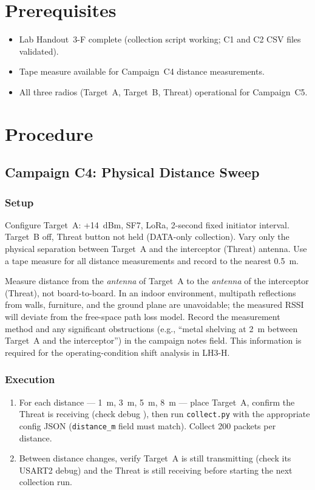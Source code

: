 \documentclass[11pt,letterpaper]{article}
\begin{document}
\section{Prerequisites}
\begin{itemize}[leftmargin=2em]
	\item Lab Handout~3-F complete (collection script working; C1 and C2 CSV files validated).
	\item Tape measure available for Campaign~C4 distance measurements.
	\item All three radios (Target~A, Target~B, Threat) operational for Campaign~C5.
\end{itemize}

\section{Procedure}

\subsection{Campaign C4: Physical Distance Sweep}

\subsubsection{Setup}
Configure Target~A: +14~dBm, SF7, LoRa, 2-second fixed initiator interval. Target~B off, Threat button not held (DATA-only collection). Vary only the physical separation between Target~A and the interceptor (Threat) antenna. Use a tape measure for all distance measurements and record to the nearest 0.5~m.

\begin{tcolorbox}[warning={Distance Measurement Protocol}]
	Measure distance from the \emph{antenna} of Target~A to the \emph{antenna} of the interceptor (Threat), not board-to-board. In an indoor environment, multipath reflections from walls, furniture, and the ground plane are unavoidable; the measured \mbox{RSSI} will deviate from the free-space path loss model. Record the measurement method and any significant obstructions (e.g., ``metal shelving at 2~m between Target~A and the interceptor'') in the campaign notes field. This information is required for the operating-condition shift analysis in LH3-H.
\end{tcolorbox}

\subsubsection{Execution}
\begin{enumerate}[leftmargin=2em]
	\item For each distance --- 1~m, 3~m, 5~m, 8~m --- place Target~A, confirm the Threat is receiving (check debug \UART{}), then run \texttt{collect.py} with the appropriate config JSON (\texttt{distance\_m} field must match). Collect 200 packets per distance.
	\item Between distance changes, verify Target~A is still transmitting (check its USART2 debug) and the Threat is still receiving before starting the next collection run.
\end{enumerate}
\end{document}
